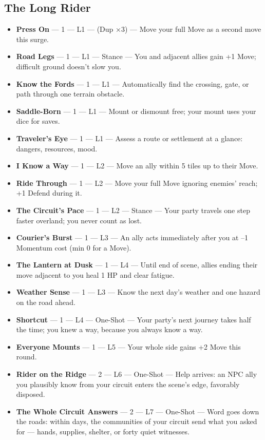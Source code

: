 \subsection{The Long Rider}
\begin{itemize}
    \item \textbf{Press On} --- 1 --- L1 --- (Dup ×3) --- Move your full Move as a second move this surge.
    \item \textbf{Road Legs} --- 1 --- L1 --- Stance --- You and adjacent allies gain +1 Move; difficult ground doesn't slow you.
    \item \textbf{Know the Fords} --- 1 --- L1 --- Automatically find the crossing, gate, or path through one terrain obstacle.
    \item \textbf{Saddle-Born} --- 1 --- L1 --- Mount or dismount free; your mount uses your dice for saves.
    \item \textbf{Traveler's Eye} --- 1 --- L1 --- Assess a route or settlement at a glance: dangers, resources, mood.
    \item \textbf{I Know a Way} --- 1 --- L2 --- Move an ally within 5 tiles up to their Move.
    \item \textbf{Ride Through} --- 1 --- L2 --- Move your full Move ignoring enemies' reach; +1 Defend during it.
    \item \textbf{The Circuit's Pace} --- 1 --- L2 --- Stance --- Your party travels one step faster overland; you never count as lost.
    \item \textbf{Courier's Burst} --- 1 --- L3 --- An ally acts immediately after you at --1 Momentum cost (min 0 for a Move).
    \item \textbf{The Lantern at Dusk} --- 1 --- L4 --- Until end of scene, allies ending their move adjacent to you heal 1 HP and clear fatigue.
    \item \textbf{Weather Sense} --- 1 --- L3 --- Know the next day's weather and one hazard on the road ahead.
    \item \textbf{Shortcut} --- 1 --- L4 --- One-Shot --- Your party's next journey takes half the time; you knew a way, because you always know a way.
    \item \textbf{Everyone Mounts} --- 1 --- L5 --- Your whole side gains +2 Move this round.
    \item \textbf{Rider on the Ridge} --- 2 --- L6 --- One-Shot --- Help arrives: an NPC ally you plausibly know from your circuit enters the scene's edge, favorably disposed.
    \item \textbf{The Whole Circuit Answers} --- 2 --- L7 --- One-Shot --- Word goes down the roads: within days, the communities of your circuit send what you asked for --- hands, supplies, shelter, or forty quiet witnesses.
\end{itemize}

